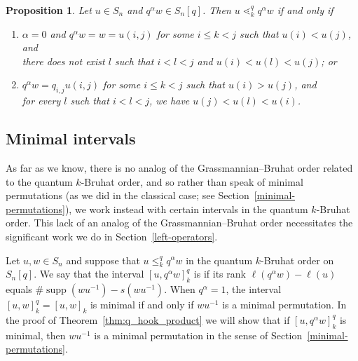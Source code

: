 \documentclass[12pt,oneside,reqno]{amsart}
\newtheorem{proposition}[theorem]{Proposition}
\theoremstyle{definition}
\numberwithin{equation}{section}
\DeclareMathOperator{\supp}{supp}
\newcommand{\defcolor}[1]{{\color{RoyalBlue}#1}}
\newcommand{\demph}[1]{\defcolor{{\sl #1}}}
\begin{document}
\begin{proposition}
    \label{prop:quantum-k-bruhat-covers}
    Let $u \in S_n$ and $q^\alpha w \in S_n[q]$.
    Then $u \lessdot_k^q q^\alpha w$ if and only if
    \begin{enumerate}
        \item\label{prop:quantum-k-bruhat-classic-covers}
            $\alpha=0$ and $q^\alpha w =w= u(i, j)$ for some $i \leq k < j$ such that $u(i) < u(j)$, and
            \\
            there does not exist $l$ such that $i < l < j$ and $u(i) < u(l) < u(j)$; or

        \item\label{prop:quantum-k-bruhat-quantum-covers}
            $q^\alpha w = q_{i,j} u(i, j)$ for some $i \leq k < j$ such that $u(i) > u(j)$, and
            \\
            for every $l$ such that $i < l < j$, we have $u(j) < u(l) < u(i)$.
    \end{enumerate}
\end{proposition}



\subsection{Minimal intervals}
\label{sec:Qminim}

As far as we know, there is no analog of the Grassmannian--Bruhat order
related to the quantum $k$-Bruhat order, and so rather than speak of minimal
permutations (as we did in the classical case; see
Section~\ref{minimal-permutations}), we work instead with certain
intervals in the quantum $k$-Bruhat order.
This lack of an analog of the Grassmannian--Bruhat order necessitates the significant work we do in Section~\ref{left-operators}.

Let $u, w \in S_n$ and suppose that $u \leq_k^q q^{\alpha}w$ in the quantum
$k$-Bruhat order on $S_n[q]$.
We say that the interval $[u,q^\alpha w]_k^q$ is \demph{minimal} if
its rank $\ell(q^{\alpha}w)-\ell(u)$ equals $\#\supp(wu^{-1}) - s(wu^{-1})$.
When $q^\alpha=1$, the interval $[u, w]_k^q=[u,w]_k$ is minimal if and only if $wu^{-1}$ is a minimal permutation.
In the proof of Theorem~\ref{thm:q_hook_product} we will show that if $[u,q^\alpha w]_k^q$ is minimal, then $wu^{-1}$ is a
minimal permutation in the sense of Section~\ref{minimal-permutations}.
\end{document}
